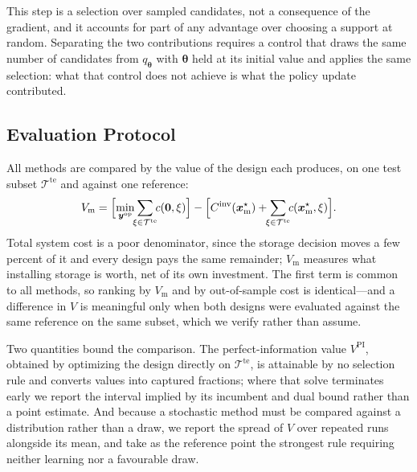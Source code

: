 \documentclass[journal]{IEEEtran}
\begin{document}
This step is a selection over sampled candidates, not a consequence of the
gradient, and it accounts for part of any advantage over choosing a
support at random. Separating the two contributions requires a control
that draws the same number of candidates from $q_{\boldsymbol{\theta}}$
with $\boldsymbol{\theta}$ held at its initial value and applies the same
selection: what that control does not achieve is what the policy update
contributed.

\subsection{Evaluation Protocol}
\label{sec:protocol}

All methods are compared by the value of the design each produces, on one
test subset $\mathcal{T}^{\mathrm{te}}$ and against one reference:
\begin{equation}
V_{\mathrm{m}}
=
\Bigl[
\min_{\boldsymbol{y}^{\mathrm{op}}}
\!\!\sum_{\xi\in\mathcal{T}^{\mathrm{te}}}\!\!c(\boldsymbol{0},\xi)
\Bigr]
-
\Bigl[
C^{\mathrm{inv}}(\boldsymbol{x}^{\star}_{\mathrm{m}})
+\!\!\sum_{\xi\in\mathcal{T}^{\mathrm{te}}}\!\!
c(\boldsymbol{x}^{\star}_{\mathrm{m}},\xi)
\Bigr].
\label{eq:storage_value}
\end{equation}
Total system cost is a poor denominator, since the storage decision moves
a few percent of it and every design pays the same remainder;
$V_{\mathrm{m}}$ measures what installing storage is worth, net of its own
investment. The first term is common to all methods, so ranking by
$V_{\mathrm{m}}$ and by out-of-sample cost is identical---and a difference
in $V$ is meaningful only when both designs were evaluated against the
same reference on the same subset, which we verify rather than assume.

Two quantities bound the comparison. The perfect-information value
$V^{\mathrm{PI}}$, obtained by optimizing the design directly on
$\mathcal{T}^{\mathrm{te}}$, is attainable by no selection rule and
converts values into captured fractions; where that solve terminates early
we report the interval implied by its incumbent and dual bound rather than
a point estimate. And because a stochastic method must be compared against
a distribution rather than a draw, we report the spread of $V$ over
repeated runs alongside its mean, and take as the reference point the
strongest rule requiring neither learning nor a favourable draw.

\end{document}
